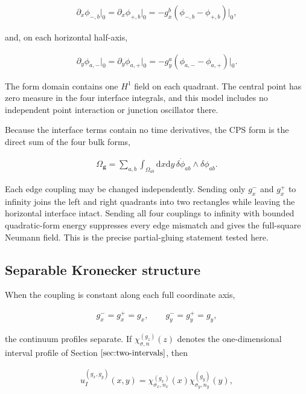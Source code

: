 \begin{align}
\partial_x\phi_{-,b}\big|_{0}
=\partial_x\phi_{+,b}\big|_{0}
=-g_x^b(\phi_{-,b}-\phi_{+,b})\big|_{0},
\end{align}

and, on each horizontal half-axis,

\begin{align}
\partial_y\phi_{a,-}\big|_{0}
=\partial_y\phi_{a,+}\big|_{0}
=-g_y^a(\phi_{a,-}-\phi_{a,+})\big|_{0}.
\end{align}

The form domain contains one $H^1$ field on each quadrant. The central point has zero measure in the four interface integrals, and this model includes no independent point interaction or junction oscillator there.

Because the interface terms contain no time derivatives, the CPS form is the direct sum of the four bulk forms,

\begin{align}
\Omega_{\boldsymbol g}
=\sum_{a,b}\int_{\Omega_{ab}}\mathrm dx\mathrm dy\,
\delta\dot\phi_{ab}\wedge\delta\phi_{ab}.
\end{align}

Each edge coupling may be changed independently. Sending only $g_x^-$ and $g_x^+$ to infinity joins the left and right quadrants into two rectangles while leaving the horizontal interface intact. Sending all four couplings to infinity with bounded quadratic-form energy suppresses every edge mismatch and gives the full-square Neumann field. This is the precise partial-gluing statement tested here.

\subsection{Separable Kronecker structure}\label{subsec:four-region-separable}

When the coupling is constant along each full coordinate axis,

\begin{align}
g_x^-=g_x^+=g_x,
\qquad
g_y^-=g_y^+=g_y,
\end{align}

the continuum profiles separate. If $\chi_{\sigma,n}^{(g_z)}(z)$ denotes the one-dimensional interval profile of Section $\ref{sec:two-intervals}$, then

\begin{align}
u_I^{(g_x,g_y)}(x,y)
=\chi_{\sigma_x,n_x}^{(g_x)}(x)
\chi_{\sigma_y,n_y}^{(g_y)}(y),
\end{align}

